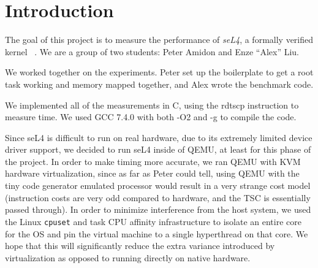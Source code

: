 \section{Introduction}
The goal of this project is to measure the performance of \textit{seL4},
a formally verified kernel ~\cite{klein2009sel4}. 
We are a group of two students: Peter Amidon and Enze ``Alex'' Liu. 

We worked together on the experiments. Peter set up the boilerplate to
get a root task working and memory mapped together, and Alex wrote the
benchmark code.

We implemented all of the measurements in C, using the rdtscp
instruction to measure time.  We used GCC 7.4.0 with both -O2 and -g
to compile the code.

Since seL4 is difficult to run on real hardware, due to its extremely
limited device driver support, we decided to run seL4 inside of QEMU,
at least for this phase of the project. In order to make timing more
accurate, we ran QEMU with KVM hardware virtualization, since as far
as Peter could tell, using QEMU with the tiny code generator emulated
processor would result in a very strange cost model (instruction costs
are very odd compared to hardware, and the TSC is essentially passed
through). In order to minimize interference from the host system, we
used the Linux \verb|cpuset| and task CPU affinity infrastructure to
isolate an entire core for the OS and pin the virtual machine to a
single hyperthread on that core. We hope that this will significantly
reduce the extra variance introduced by virtualization as opposed to
running directly on native hardware.
